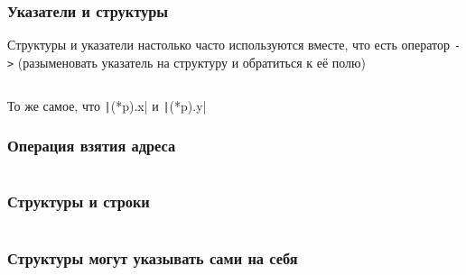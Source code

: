 \documentclass[aspectratio=169]{beamer}
\begin{document}
\begin{frame}
    \frametitle{Указатели и структуры}
    Структуры и указатели настолько часто используются вместе, что есть оператор \texttt{->} (разыменовать указатель на структуру и обратиться к её полю)
    \begin{footnotesize}
        \inputminted[extrakeywordstype={Point}, firstline=8, lastline=20]{c}{structPointer.c}
    \end{footnotesize}
    То же самое, что \texttt|(*p).x| и \texttt|(*p).y|
\end{frame}

\begin{frame}[fragile]
    \frametitle{Операция взятия адреса}
    \inputminted[extrakeywordstype={Point}, firstline=8, lastline=17]{c}{structRef.c}
\end{frame}

\begin{frame}[fragile]
    \frametitle{Структуры и строки}
    \begin{footnotesize}
        \inputminted[extrakeywordstype={PhoneBookEntry}, firstline=4, lastline=22]{c}{structStr.c}
    \end{footnotesize}
\end{frame}


\begin{frame}[fragile]
    \frametitle{Структуры могут указывать сами на себя}
    \begin{footnotesize}
        \inputminted[extrakeywordstype={ListElement}, firstline=4, lastline=22]{c}{structSelf.c}
    \end{footnotesize}
\end{frame}
\end{document}
